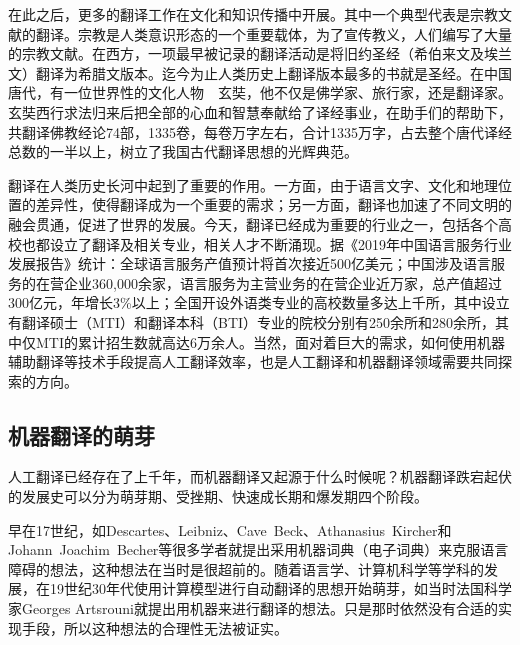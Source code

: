 \parinterval 在此之后，更多的翻译工作在文化和知识传播中开展。其中一个典型代表是宗教文献的翻译。宗教是人类意识形态的一个重要载体，为了宣传教义，人们编写了大量的宗教文献。在西方，一项最早被记录的翻译活动是将旧约圣经（希伯来文及埃兰文）翻译为希腊文版本。迄今为止人类历史上翻译版本最多的书就是圣经。在中国唐代，有一位世界性的文化人物\ \dash \ 玄奘，他不仅是佛学家、旅行家，还是翻译家。玄奘西行求法归来后把全部的心血和智慧奉献给了译经事业，在助手们的帮助下，共翻译佛教经论74部，1335卷，每卷万字左右，合计1335万字，占去整个唐代译经总数的一半以上，树立了我国古代翻译思想的光辉典范。

\parinterval 翻译在人类历史长河中起到了重要的作用。一方面，由于语言文字、文化和地理位置的差异性，使得翻译成为一个重要的需求；另一方面，翻译也加速了不同文明的融会贯通，促进了世界的发展。今天，翻译已经成为重要的行业之一，包括各个高校也都设立了翻译及相关专业，相关人才不断涌现。据《2019年中国语言服务行业发展报告》统计：全球语言服务产值预计将首次接近500亿美元；中国涉及语言服务的在营企业360,000余家，语言服务为主营业务的在营企业近万家，总产值超过300亿元，年增长3\%以上；全国开设外语类专业的高校数量多达上千所，其中设立有翻译硕士（MTI）和翻译本科（BTI）专业的院校分别有250余所和280余所，其中仅MTI的累计招生数就高达6万余人。当然，面对着巨大的需求，如何使用机器辅助翻译等技术手段提高人工翻译效率，也是人工翻译和机器翻译领域需要共同探索的方向。


\subsection{机器翻译的萌芽}

\parinterval 人工翻译已经存在了上千年，而机器翻译又起源于什么时候呢？机器翻译跌宕起伏的发展史可以分为萌芽期、受挫期、快速成长期和爆发期四个阶段。

\parinterval 早在17世纪，如Descartes、Leibniz、Cave\ Beck、Athanasius\ Kircher和Johann\ Joachim\ Becher等很多学者就提出采用机器词典（电子词典）来克服语言障碍的想法，这种想法在当时是很超前的。随着语言学、计算机科学等学科的发展，在19世纪30年代使用计算模型进行自动翻译的思想开始萌芽，如当时法国科学家Georges Artsrouni就提出用机器来进行翻译的想法。只是那时依然没有合适的实现手段，所以这种想法的合理性无法被证实。

